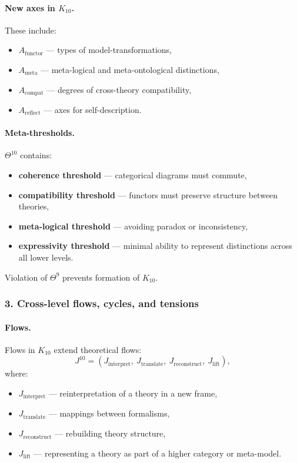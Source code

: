\paragraph{New axes in $K_{10}$.}
These include:
\begin{itemize}
  \item $A_{\mathrm{functor}}$ — types of model-transformations,
  \item $A_{\mathrm{meta}}$ — meta-logical and meta-ontological distinctions,
  \item $A_{\mathrm{compat}}$ — degrees of cross-theory compatibility,
  \item $A_{\mathrm{reflect}}$ — axes for self-description.
\end{itemize}

\paragraph{Meta-thresholds.}
$\Theta^{10}$ contains:
\begin{itemize}
  \item \textbf{coherence threshold} — categorical diagrams must commute,
  \item \textbf{compatibility threshold} — functors must preserve structure
        between theories,
  \item \textbf{meta-logical threshold} — avoiding paradox or inconsistency,
  \item \textbf{expressivity threshold} — minimal ability to represent
        distinctions across all lower levels.
\end{itemize}

Violation of $\Theta^9$ prevents formation of $K_{10}$.

\subsubsection{3. Cross-level flows, cycles, and tensions}

\paragraph{Flows.}
Flows in $K_{10}$ extend theoretical flows:
\[
J^{10} = (J_{\mathrm{interpret}},\ J_{\mathrm{translate}},\
         J_{\mathrm{reconstruct}},\ J_{\mathrm{lift}}),
\]
where:
\begin{itemize}
  \item $J_{\mathrm{interpret}}$ — reinterpretation of a theory in a new frame,
  \item $J_{\mathrm{translate}}$ — mappings between formalisms,
  \item $J_{\mathrm{reconstruct}}$ — rebuilding theory structure,
  \item $J_{\mathrm{lift}}$ — representing a theory as part of a higher
        category or meta-model.
\end{itemize}

